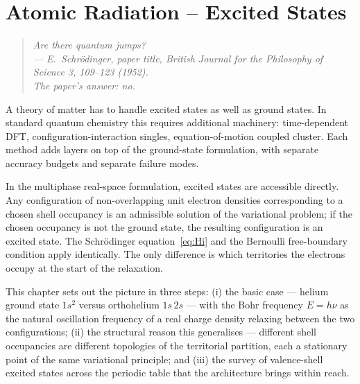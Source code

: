\chapter{Atomic Radiation -- Excited States}\label{ch:excited}


\begin{quote}
\itshape Are there quantum jumps?\\
\normalfont\hfill --- E.~Schr\"odinger, paper title, \emph{British Journal for the Philosophy of Science} 3, 109--123 (1952). \\
\normalfont\hfill The paper's answer: \emph{no}.
\end{quote}
\bigskip

A theory of matter has to handle excited states as well as ground states. In standard quantum chemistry this requires additional machinery: time-dependent DFT, configuration-interaction singles, equation-of-motion coupled cluster. Each method adds layers on top of the ground-state formulation, with separate accuracy budgets and separate failure modes.

In the multiphase real-space formulation, excited states are accessible directly. Any configuration of non-overlapping unit electron densities corresponding to a chosen shell occupancy is an admissible solution of the variational problem; if the chosen occupancy is not the ground state, the resulting configuration is an excited state. The Schr\"odinger equation~\eqref{eq:Hi} and the Bernoulli free-boundary condition apply identically. The only difference is which territories the electrons occupy at the start of the relaxation.

This chapter sets out the picture in three steps: (i) the basic case --- helium ground state $1s^2$ versus orthohelium $1s\,2s$ --- with the Bohr frequency $E = h\nu$ as the natural oscillation frequency of a real charge density relaxing between the two configurations; (ii) the structural reason this generalises --- different shell occupancies are different topologies of the territorial partition, each a stationary point of the same variational principle; and (iii) the survey of valence-shell excited states across the periodic table that the architecture brings within reach.

